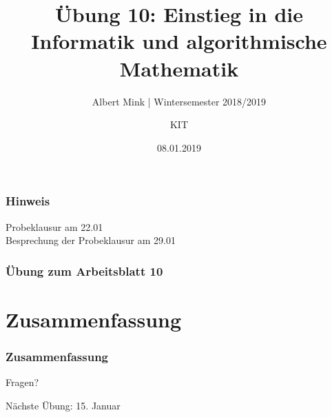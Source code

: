 \documentclass[c,18pt]{beamer}
\date{08.01.2019}
\title[Übung 10: Einstieg in die Informatik und algorithmische Mathematik]
  {Übung 10: Einstieg in die Informatik und algorithmische Mathematik}
\subtitle{Albert Mink | Wintersemester 2018/2019}
\author[Albert Mink, ]{KIT}
\institute[Institut für Angewandte und Numerische Mathematik (IANM)]{Institut für Angewandte und Numerische Mathematik}
\begin{document}
\begin{frame}
  \maketitle
\end{frame}

\begin{frame}
  \frametitle{Hinweis}%

Probeklausur am 22.01
\\
Besprechung der Probeklausur am 29.01
\end{frame}

\begin{frame}
  \frametitle{Übung zum Arbeitsblatt 10}%
\tableofcontents[hideallsubsections]
\end{frame}


\setcounter{exercise}{31}
\setcounter{exercise}{32}

\section{Zusammenfassung}
\begin{frame}
  \frametitle{Zusammenfassung}%
\tableofcontents[hideallsubsections]
\end{frame}

\begin{frame}
\centering
\Huge\textcolor{KITgreen}{Fragen?}
\vspace{2cm}

{\LARGE
N\"achste \"Ubung: 15. Januar\\
}
\end{frame}


\end{document}
